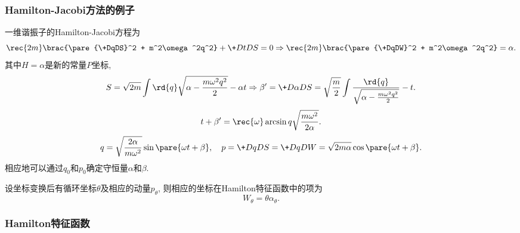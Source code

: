 \documentclass[../TheoreticalMechanics.tex]{subfiles}
\begin{document}

\subsubsection{Hamilton-Jacobi方法的例子} %
\label{ssub:hamilton_jacobi方法的例子}

\begin{ex}
    一维谐振子的Hamilton-Jacobi方程为
    \[ \rec{2m}\brac{\pare{\+DqDS}^2 + m^2\omega^2q^2} + \+DtDS = 0 \Rightarrow \rec{2m}\brac{\pare{\+DqDW}^2 + m^2\omega^2q^2} = \alpha. \]
    其中$H=\alpha$是新的常量$P$坐标,
    \[ S = \sqrt{2m} \int \rd{q}\sqrt{\alpha-\frac{m\omega^2q^2}{2}} - \alpha t \Rightarrow \beta' = \+D\alpha DS = \sqrt{\frac{m}{2}}\int \frac{\rd{q}}{\sqrt{\alpha-\frac{m\omega^2q^2}{2}}} - t. \]
    \[ t+\beta' = \rec{\omega}\arcsin q\sqrt{\frac{m\omega^2}{2\alpha}}. \]
    \[ q = \sqrt{\frac{2\alpha}{m\omega^2}}\sin\pare{\omega t + \beta},\quad p = \+DqDS = \+DqDW = \sqrt{2m\alpha} \cos\pare{\omega t + \beta}. \]
    相应地可以通过$q_0$和$p_0$确定守恒量$\alpha$和$\beta$.
\end{ex}
\begin{lemma}[循环坐标在Hamilton特征函数中的项]
    设坐标变换后有循环坐标$\theta$及相应的动量$p_\theta$, 则相应的坐标在Hamilton特征函数中的项为
    \[ W_\theta = \theta\alpha_\theta. \]
\end{lemma}


\subsubsection{Hamilton特征函数} %
\label{ssub:hamilton特征函数}
\end{document}
